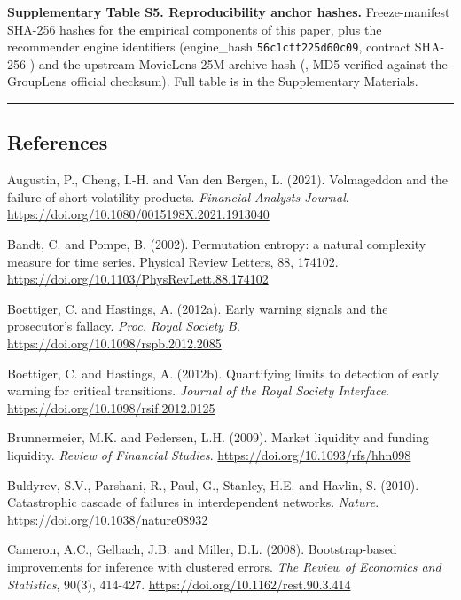 \documentclass[
  11pt,
]{article}
\begin{document}
\textbf{Supplementary Table S5. Reproducibility anchor hashes.}
Freeze-manifest SHA-256 hashes for the empirical components of this
paper, plus the recommender engine identifiers (engine\_hash
\texttt{56c1cff225d60c09}, contract SHA-256
\texttt{})
and the upstream MovieLens-25M archive hash
(\texttt{},
MD5-verified against the GroupLens official checksum). Full table is in
the Supplementary Materials.

\begin{center}\rule{0.5\linewidth}{0.5pt}\end{center}

\subsection{References}\label{references}

Augustin, P., Cheng, I.-H. and Van den Bergen, L. (2021). Volmageddon
and the failure of short volatility products. \emph{Financial Analysts
Journal}. \url{https://doi.org/10.1080/0015198X.2021.1913040}

Bandt, C. and Pompe, B. (2002). Permutation entropy: a natural
complexity measure for time series. Physical Review Letters, 88, 174102.
\url{https://doi.org/10.1103/PhysRevLett.88.174102}

Boettiger, C. and Hastings, A. (2012a). Early warning signals and the
prosecutor's fallacy. \emph{Proc. Royal Society B}.
\url{https://doi.org/10.1098/rspb.2012.2085}

Boettiger, C. and Hastings, A. (2012b). Quantifying limits to detection
of early warning for critical transitions. \emph{Journal of the Royal
Society Interface}. \url{https://doi.org/10.1098/rsif.2012.0125}

Brunnermeier, M.K. and Pedersen, L.H. (2009). Market liquidity and
funding liquidity. \emph{Review of Financial Studies}.
\url{https://doi.org/10.1093/rfs/hhn098}

Buldyrev, S.V., Parshani, R., Paul, G., Stanley, H.E. and Havlin, S.
(2010). Catastrophic cascade of failures in interdependent networks.
\emph{Nature}. \url{https://doi.org/10.1038/nature08932}

Cameron, A.C., Gelbach, J.B. and Miller, D.L. (2008). Bootstrap-based
improvements for inference with clustered errors. \emph{The Review of
Economics and Statistics}, 90(3), 414-427.
\url{https://doi.org/10.1162/rest.90.3.414}
\end{document}
